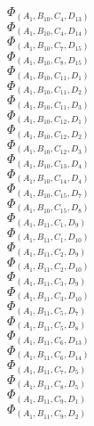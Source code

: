 \documentclass[14pt]{article}
\begin{document}
    $\Phi_{({A}_{1}, {B}_{10}, {C}_{4}, {D}_{13})}$ \\ 
    $\Phi_{({A}_{1}, {B}_{10}, {C}_{4}, {D}_{14})}$ \\ 
    $\Phi_{({A}_{1}, {B}_{10}, {C}_{7}, {D}_{15})}$ \\ 
    $\Phi_{({A}_{1}, {B}_{10}, {C}_{8}, {D}_{15})}$ \\ 
    $\Phi_{({A}_{1}, {B}_{10}, {C}_{11}, {D}_{1})}$ \\ 
    $\Phi_{({A}_{1}, {B}_{10}, {C}_{11}, {D}_{2})}$ \\ 
    $\Phi_{({A}_{1}, {B}_{10}, {C}_{11}, {D}_{3})}$ \\ 
    $\Phi_{({A}_{1}, {B}_{10}, {C}_{12}, {D}_{1})}$ \\ 
    $\Phi_{({A}_{1}, {B}_{10}, {C}_{12}, {D}_{2})}$ \\ 
    $\Phi_{({A}_{1}, {B}_{10}, {C}_{12}, {D}_{3})}$ \\ 
    $\Phi_{({A}_{1}, {B}_{10}, {C}_{13}, {D}_{4})}$ \\ 
    $\Phi_{({A}_{1}, {B}_{10}, {C}_{14}, {D}_{4})}$ \\ 
    $\Phi_{({A}_{1}, {B}_{10}, {C}_{15}, {D}_{7})}$ \\ 
    $\Phi_{({A}_{1}, {B}_{10}, {C}_{15}, {D}_{8})}$ \\ 
    $\Phi_{({A}_{1}, {B}_{11}, {C}_{1}, {D}_{9})}$ \\ 
    $\Phi_{({A}_{1}, {B}_{11}, {C}_{1}, {D}_{10})}$ \\ 
    $\Phi_{({A}_{1}, {B}_{11}, {C}_{2}, {D}_{9})}$ \\ 
    $\Phi_{({A}_{1}, {B}_{11}, {C}_{2}, {D}_{10})}$ \\ 
    $\Phi_{({A}_{1}, {B}_{11}, {C}_{3}, {D}_{9})}$ \\ 
    $\Phi_{({A}_{1}, {B}_{11}, {C}_{3}, {D}_{10})}$ \\ 
    $\Phi_{({A}_{1}, {B}_{11}, {C}_{5}, {D}_{7})}$ \\ 
    $\Phi_{({A}_{1}, {B}_{11}, {C}_{5}, {D}_{8})}$ \\ 
    $\Phi_{({A}_{1}, {B}_{11}, {C}_{6}, {D}_{13})}$ \\ 
    $\Phi_{({A}_{1}, {B}_{11}, {C}_{6}, {D}_{14})}$ \\ 
    $\Phi_{({A}_{1}, {B}_{11}, {C}_{7}, {D}_{5})}$ \\ 
    $\Phi_{({A}_{1}, {B}_{11}, {C}_{8}, {D}_{5})}$ \\ 
    $\Phi_{({A}_{1}, {B}_{11}, {C}_{9}, {D}_{1})}$ \\ 
    $\Phi_{({A}_{1}, {B}_{11}, {C}_{9}, {D}_{2})}$ \\ 
\end{document}
